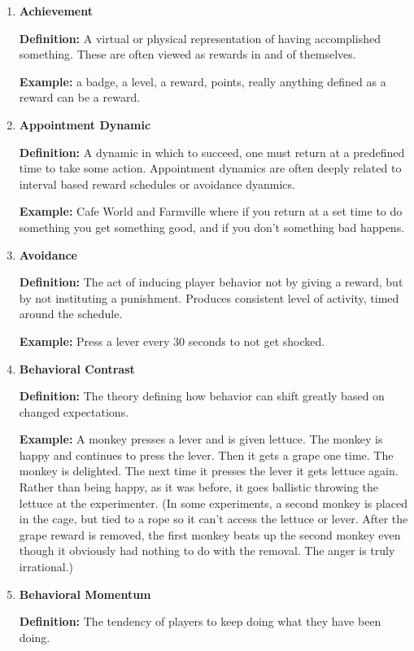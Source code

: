 \begin{enumerate}
\item \textbf{Achievement}

\textbf{Definition:} A virtual or physical representation of having accomplished something. These are often viewed as rewards in and of themselves.

\textbf{Example:} a badge, a level, a reward, points, really anything defined as a reward can be a reward.

\item \textbf{Appointment Dynamic}

\textbf{Definition:} A dynamic in which to succeed, one must return at a predefined time to take some action. Appointment dynamics are often deeply related to interval based reward schedules or avoidance dyanmics.

\textbf{Example:} Cafe World and Farmville where if you return at a set time to do something you get something good, and if you don’t something bad happens.

\item \textbf{Avoidance}

\textbf{Definition:} The act of inducing player behavior not by giving a reward, but by not instituting a punishment. Produces consistent level of activity, timed around the schedule.

\textbf{Example:} Press a lever every 30 seconds to not get shocked.

\item \textbf{Behavioral Contrast}

\textbf{Definition:} The theory defining how behavior can shift greatly based on changed expectations.

\textbf{Example:} A monkey presses a lever and is given lettuce. The monkey is happy and continues to press the lever. Then it gets a grape one time. The monkey is delighted. The next time it presses the lever it gets lettuce again. Rather than being happy, as it was before, it goes ballistic throwing the lettuce at the experimenter. (In some experiments, a second monkey is placed in the cage, but tied to a rope so it can’t access the lettuce or lever. After the grape reward is removed, the first monkey beats up the second monkey even though it obviously had nothing to do with the removal. The anger is truly irrational.)

\item \textbf{Behavioral Momentum}

\textbf{Definition:} The tendency of players to keep doing what they have been doing.


\end{enumerate}
